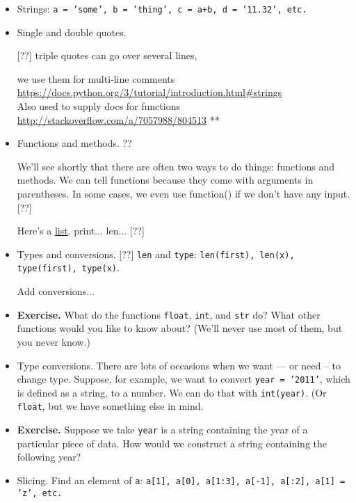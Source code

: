 \documentclass[11pt]{article}
\begin{document}
\begin{itemize}


\item Strings:  {\tt a = 'some', b = 'thing', c = a+b, d = '11.32', etc.}

\item Single and double quotes.

[??] triple quotes can go over several lines,

we use them for multi-line comments \\
\url{https://docs.python.org/3/tutorial/introduction.html#strings} \\

Also used to supply docs for functions
\url{http://stackoverflow.com/a/7057988/804513} **

\item Functions and methods. ??

We'll see shortly that there are often two ways to do things:
functions and methods.
We can tell functions because they come with arguments in parentheses.
In some cases, we even use function() if we don't have any input.  [??]

Here's a \href{https://docs.python.org/3.4/library/functions.html}{list}.
print...  len...  [??]

\item Types and conversions.  [??]  {\tt len} and {\tt type}:
{\tt len(first), len(x), type(first), type(x)}.

Add conversions...

\item {\bf Exercise.}
Wbat do the functions {\tt float}, {\tt int}, and {\tt str} do?
What other functions would you like to know about?
(We'll never use most of them, but you never know.)

\item Type conversions.
There are lots of occasions when we want --- or need -- to change type.
Suppose, for example, we want to convert {\tt year = '2011'},
which is defined as a string, to a number.
We can do that with {\tt int(year)}.  (Or {\tt float}, but we have something else in mind.

\item {\bf Exercise.}
Suppose we take {\tt year} is a string containing the year of a particular piece of data.
How would we construct a string containing the following year?

\item Slicing.  Find an element of {\tt a}: {\tt a[1], a[0], a[1:3], a[-1], a[:2], a[1] = 'z', etc.}


\end{itemize}
\end{document}
